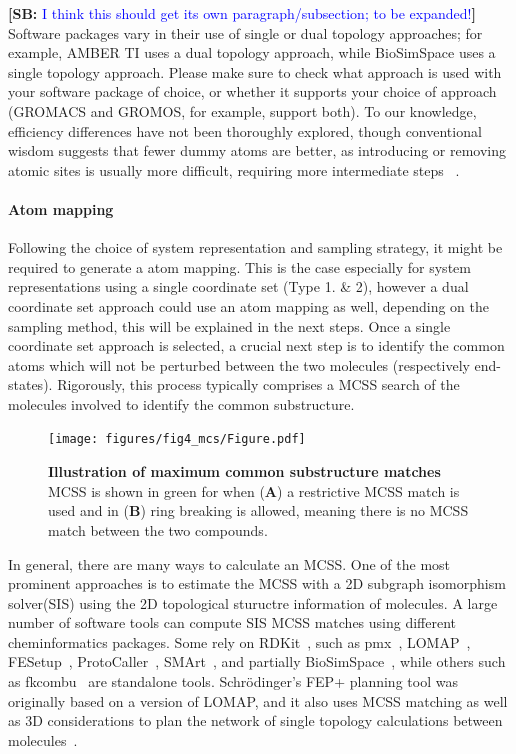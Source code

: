 \documentclass[9pt,bestpractices]{livecoms}
\newcommand{\sbnote}[1]{%
  {\bfseries{}[SB: }%
  {\textcolor{blue}{#1}}{\bfseries{}]}
}
\begin{document}
\sbnote{I think this should get its own paragraph/subsection; to be expanded!} Software packages vary in their use of single or dual topology approaches; for example, AMBER TI uses a dual topology approach, while BioSimSpace uses a single topology approach. Please make sure to check what approach is used with your software package of choice, or whether it supports your choice of approach (GROMACS and GROMOS, for example, support both). 
To our knowledge, efficiency differences have not been thoroughly explored, though conventional wisdom suggests that fewer dummy atoms are better, as introducing or removing atomic sites is usually more difficult, requiring more intermediate steps ~\cite{liu2013lead, mobley2012perspective}.

\paragraph{Atom mapping} \label{subsec: Atom Mapping}
Following the choice of system representation and sampling strategy, it might be required to generate a atom mapping. This is the case especially for system representations using a single coordinate set (Type 1. \& 2), however a dual coordinate set approach could use an atom mapping as well, depending on the sampling method, this will be explained in the next steps.
Once a single coordinate set approach is selected, a crucial next step is to identify the common atoms which will not be perturbed between the two molecules (respectively end-states).
Rigorously, this process typically comprises a MCSS search of the molecules involved to identify the common substructure.\cite{ries2024kartograf}


\begin{figure}
    \texttt{[image: figures/fig4\_mcs/Figure.pdf]}
    \caption{\textbf{Illustration of maximum common substructure matches} MCSS is shown in green for when (\textbf{A}) a restrictive MCSS match is used and in (\textbf{B}) ring breaking is allowed, meaning there is no MCSS match between the two compounds.}
    \label{fig:fig_mcss}
\end{figure} 

In general, there are many ways to calculate an MCSS. One of the most prominent approaches is to estimate the MCSS with a 2D subgraph isomorphism solver(SIS) using the 2D topological stuructre information of molecules\cite{raymond2002maximum}.
A large number of software tools can compute SIS MCSS matches using different cheminformatics packages. Some rely on RDKit~\cite{rdkit2019Dec}, such as pmx~\cite{gapsys2015pmx}, LOMAP~\cite{liu2013lead}, FESetup~\cite{loeffler2015fesetup}, ProtoCaller~\cite{suruzhon2020protocaller}, SMArt~\cite{petrov2021perturbation}, and partially BioSimSpace~\cite{hedges2019biosimspace}, while others such as fkcombu~\cite{kawabata20143d} are standalone tools. Schr\"{o}dinger's FEP+ planning tool was originally based on a version of LOMAP, and it also uses MCSS matching as well as 3D considerations to plan the network of single topology calculations between molecules~\cite{wang2015accurate}. 
\end{document}
